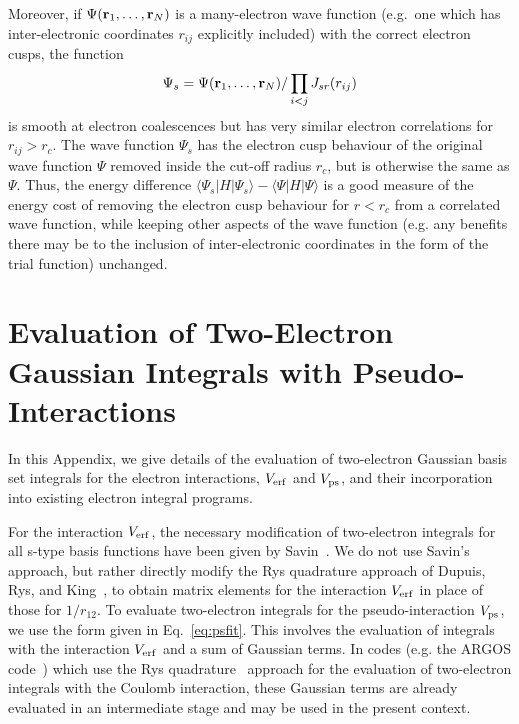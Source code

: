 Moreover, if $\Psi({\bf r}_1, \dots , {\bf r}_N)$ is a many-electron
wave function (e.g.\ one which has inter-electronic coordinates $r_{ij}$
explicitly included) with the correct electron cusps, the function 
\begin{eqnarray}
\Psi_s = \Psi({\bf r}_1, \dots , {\bf r}_N)/\prod_{i<j} J_{sr}(r_{ij}) 
\label{eq:smoothpsi}
\end{eqnarray}
is smooth at electron coalescences but has very similar electron
correlations for $r_{ij}>r_c$.
The wave function $\Psi_s$ has the electron cusp behaviour 
of the original wave function $\Psi$ removed inside the cut-off 
radius $r_c$, but is otherwise the same as $\Psi$.
Thus, the energy difference 
$\langle\Psi_s|H|\Psi_s\rangle -  \langle\Psi|H|\Psi\rangle $
is a good measure of the energy cost of removing the electron
cusp behaviour for $r<r_c$ from a correlated wave function, while
keeping other aspects of the wave function (e.g. any benefits there 
may be to the inclusion of inter-electronic coordinates in the form 
of the trial function) unchanged.


%
%
\section{Evaluation of Two-Electron Gaussian Integrals with Pseudo-Interactions}
\label{app:two_cent_int}
%
%


In this Appendix, we give details of the evaluation of two-electron 
Gaussian basis set integrals for the electron interactions, 
$V_{\rm erf}$ and $V_{\rm ps}$, and their incorporation into existing 
electron integral programs.

For the interaction $V_{\rm erf}$, the necessary modification of 
two-electron integrals for all s-type basis functions have been given 
by Savin~\cite{Savin:erf}.
We do not use Savin's approach, but rather directly modify the
Rys quadrature approach of Dupuis, Rys, and King~\cite{drk},
to obtain matrix elements for the interaction $V_{\rm erf}$
in place of those for $1/r_{12}$. 
To evaluate two-electron integrals for the pseudo-interaction 
$V_{\rm ps}$, we use the form given in Eq.~\ref{eq:psfit}. 
This involves the evaluation of integrals with the interaction 
$V_{\rm erf}$ and a sum of Gaussian terms.
In codes (e.g. the ARGOS code~\cite{COLUMBUS}) which use the Rys 
quadrature~\cite{drk} approach for the evaluation of two-electron 
integrals with the Coulomb interaction, 
these Gaussian terms are already evaluated in an intermediate stage
and may be used in the present context.


